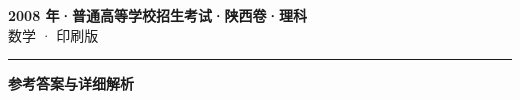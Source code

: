 \documentclass[zihao=5, a4paper]{ctexart}
\begin{document}
\begin{center}
  {\Large\bfseries 2008 年·普通高等学校招生考试·陕西卷·理科}\\[4pt]
  {\large 数学 · 印刷版}
\end{center}
\medskip
{}

\par\bigskip\hrule\bigskip
{}
\begin{center}{\large\bfseries 参考答案与详细解析}\end{center}
\smallskip

\end{document}
